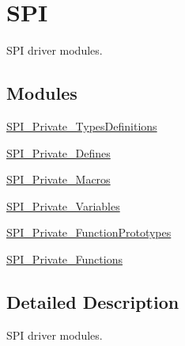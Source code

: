 \hypertarget{group___s_p_i}{\section{S\-P\-I}
\label{group___s_p_i}
}


S\-P\-I driver modules.  


\subsection*{Modules}
\begin{DoxyCompactItemize}
\item 
\hyperlink{group___s_p_i___private___types_definitions}{S\-P\-I\-\_\-\-Private\-\_\-\-Types\-Definitions}
\item 
\hyperlink{group___s_p_i___private___defines}{S\-P\-I\-\_\-\-Private\-\_\-\-Defines}
\item 
\hyperlink{group___s_p_i___private___macros}{S\-P\-I\-\_\-\-Private\-\_\-\-Macros}
\item 
\hyperlink{group___s_p_i___private___variables}{S\-P\-I\-\_\-\-Private\-\_\-\-Variables}
\item 
\hyperlink{group___s_p_i___private___function_prototypes}{S\-P\-I\-\_\-\-Private\-\_\-\-Function\-Prototypes}
\item 
\hyperlink{group___s_p_i___private___functions}{S\-P\-I\-\_\-\-Private\-\_\-\-Functions}
\end{DoxyCompactItemize}


\subsection{Detailed Description}
S\-P\-I driver modules. 